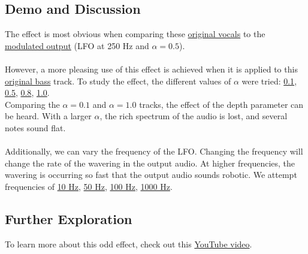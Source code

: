 \subsection{Demo and Discussion}
The effect is most obvious when comparing these \href{run:../InputAudio/22-001 Original Vocal.wav}{original vocals} to the \href{run:../OutputAudio/ring-modulation_22-001 Original Vocal_{freq=250Hz}{alpha=0.5}.wav}{modulated output} (LFO at 250 Hz and $\alpha = 0.5$). \\ \\
However, a more pleasing use of this effect is achieved when it is applied to this \href{run:../InputAudio/22-015 Original Bass.wav}{original bass} track. To study the effect, the different values of $\alpha$ were tried:
\href{run:../OutputAudio/ring-modulation_22-015 Original Bass_{freq=250Hz}{alpha=0.1}.wav}{0.1},
\href{run:../OutputAudio/ring-modulation_22-015 Original Bass_{freq=250Hz}{alpha=0.5}.wav}{0.5},
\href{run:../OutputAudio/ring-modulation_22-015 Original Bass_{freq=250Hz}{alpha=0.8}.wav}{0.8},
\href{run:../OutputAudio/ring-modulation_22-015 Original Bass_{freq=250Hz}{alpha=1.0}.wav}{1.0}. \\
Comparing the $\alpha = 0.1$ and $\alpha = 1.0$ tracks, the effect of the depth parameter can be heard. With a larger $\alpha$, the rich spectrum of the audio is lost, and several notes sound flat. \\ \\
Additionally, we can vary the frequency of the LFO. Changing the frequency will change the rate of the wavering in the output audio. At higher frequencies, the wavering is occurring so fast that the output audio sounds robotic. We attempt frequencies of
\href{run:../OutputAudio/ring-modulation_22-015 Original Bass_{freq=10Hz}{alpha=0.6}.wav}{10 Hz},
\href{run:../OutputAudio/ring-modulation_22-015 Original Bass_{freq=50Hz}{alpha=0.6}.wav}{50 Hz},
\href{run:../OutputAudio/ring-modulation_22-015 Original Bass_{freq=100Hz}{alpha=0.6}.wav}{100 Hz},
\href{run:../OutputAudio/ring-modulation_22-015 Original Bass_{freq=1000Hz}{alpha=0.6}.wav}{1000 Hz}.

\subsection{Further Exploration}
To learn more about this odd effect, check out this \href{https://www.youtube.com/watch?v=EI9W3KKDwUw}{YouTube video}.